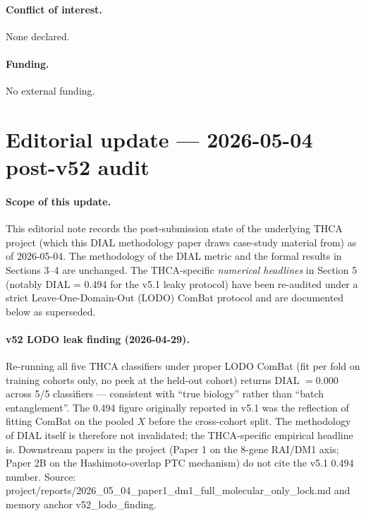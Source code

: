 \documentclass[11pt,a4paper]{article}
\begin{document}
\paragraph{Conflict of interest.} None declared.

\paragraph{Funding.} No external funding.


\section*{Editorial update --- 2026-05-04 post-v52 audit}
\label{sec:editorial_update_2026_05_04}

\paragraph{Scope of this update.} This editorial note records the
post-submission state of the underlying THCA project (which this
DIAL methodology paper draws case-study material from) as of
2026-05-04. The methodology of the DIAL metric and the formal
results in Sections 3--4 are unchanged. The THCA-specific
\emph{numerical headlines} in Section 5 (notably DIAL = 0.494 for
the v5.1 leaky protocol) have been re-audited under a strict
Leave-One-Domain-Out (LODO) ComBat protocol and are documented
below as superseded.

\paragraph{v52 LODO leak finding (2026-04-29).} Re-running all
five THCA classifiers under proper LODO ComBat (fit per fold on
training cohorts only, no peek at the held-out cohort) returns
DIAL $= 0.000$ across 5/5 classifiers --- consistent with
``true biology'' rather than ``batch entanglement''. The 0.494
figure originally reported in v5.1 was the reflection of fitting
ComBat on the pooled $X$ before the cross-cohort split. The
methodology of DIAL itself is therefore not invalidated; the
THCA-specific empirical headline is. Downstream papers in the
project (Paper 1 on the 8-gene RAI/DM1 axis; Paper 2B on the
Hashimoto-overlap PTC mechanism) do not cite the v5.1 0.494
number. Source: project/reports/2026\_05\_04\_paper1\_dm1\_full\_molecular\_only\_lock.md
and memory anchor v52\_lodo\_finding.
\end{document}

